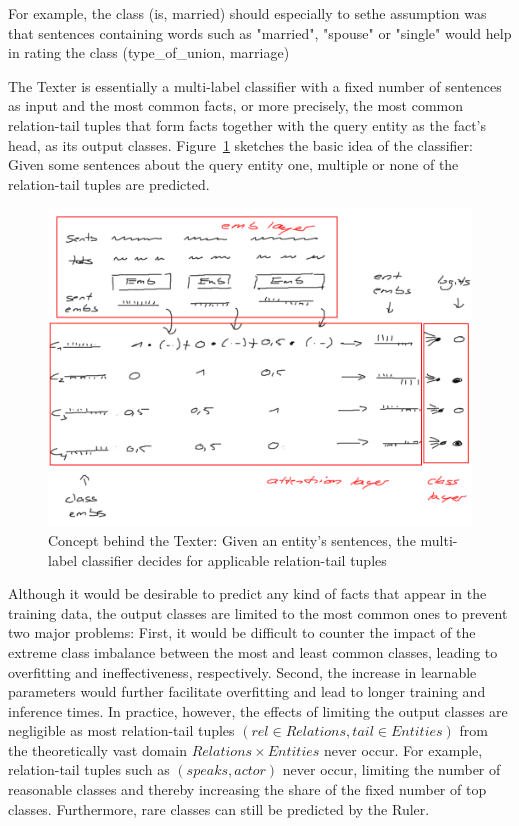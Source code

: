 

For example, the class (is, married) should especially to sethe assumption was that sentences containing words such as "married", "spouse" or "single" would help in rating the class (type\_of\_union, marriage)

The Texter is essentially a multi-label classifier with a fixed number of sentences as input and the most common facts, or more precisely, the most common relation-tail tuples that form facts together with the query entity as the fact's head, as its output classes. Figure~\ref{fig:4_approach/1_texter/2_attention_model/texter_architecture} sketches the basic idea of the classifier: Given some sentences about the query entity one, multiple or none of the relation-tail tuples are predicted.

\begin{figure}
    \centering
    \includegraphics[width=\textwidth]{4_approach/1_texter/2_attention_model/texter_architecture}
    \caption{Concept behind the Texter: Given an entity's sentences, the multi-label classifier decides for applicable relation-tail tuples}
    \label{fig:4_approach/1_texter/2_attention_model/texter_architecture}
\end{figure}

Although it would be desirable to predict any kind of facts that appear in the training data, the output classes are limited to the most common ones to prevent two major problems: First, it would be difficult to counter the impact of the extreme class imbalance between the most and least common classes, leading to overfitting and ineffectiveness, respectively. Second, the increase in learnable parameters would further facilitate overfitting and lead to longer training and inference times. In practice, however, the effects of limiting the output classes are negligible as most relation-tail tuples $(rel \in Relations, tail \in Entities)$ from the theoretically vast domain $Relations \times Entities$ never occur. For example, relation-tail tuples such as $(speaks, actor)$ never occur, limiting the number of reasonable classes and thereby increasing the share of the fixed number of top classes. Furthermore, rare classes can still be predicted by the Ruler.

